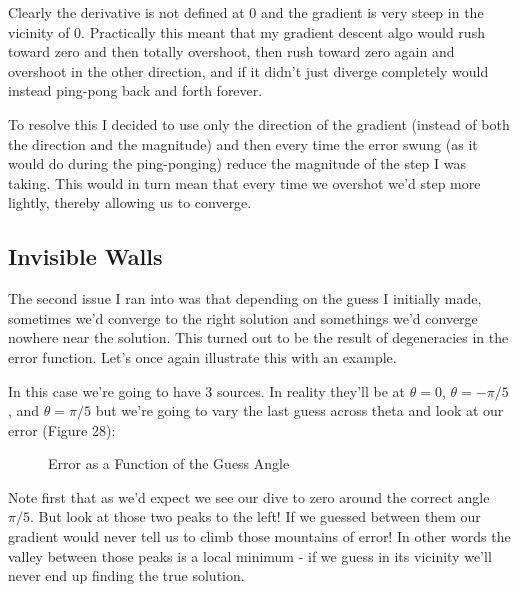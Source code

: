 \documentclass[10pt,a4paper]{article}
\begin{document}
Clearly the derivative is not defined at 0 and the gradient is very steep in the vicinity of 0. Practically this meant that my gradient descent algo would rush toward zero and then totally overshoot, then rush toward zero again and overshoot in the other direction, and if it didn't just diverge completely would instead ping-pong back and forth forever. 

To resolve this I decided to use only the direction of the gradient (instead of both the direction and the magnitude) and then every time the error swung (as it would do during the ping-ponging) reduce the magnitude of the step I was taking. This would in turn mean that every time we overshot we'd step more lightly, thereby allowing us to converge. 

\subsection{Invisible Walls}
The second issue I ran into was that depending on the guess I initially made, sometimes we'd converge to the right solution and somethings we'd converge nowhere near the solution. This turned out to be the result of degeneracies in the error function. Let's once again illustrate this with an example.

In this case we're going to have 3 sources. In reality they'll be at $\theta=0$, $\theta=-\pi/5$, and $\theta=\pi/5$ but we're going to vary the last guess across theta and look at our error (Figure 28):

\begin{figure}[!htb]
\caption{\label{fig:my-label} Error as a Function of the Guess Angle}
\end{figure}

Note first that as we'd expect we see our dive to zero around the correct angle $\pi/5$. But look at those two peaks to the left! If we guessed between them our gradient would never tell us to climb those mountains of error! In other words the valley between those peaks is a local minimum - if we guess in its vicinity we'll never end up finding the true solution. 
\end{document}
